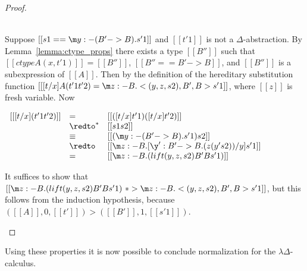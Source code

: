 \begin{proof}
\begin{itemize}
    \ \\
    Suppose $[[s1 == \m y:{-(B'->B)}.s'1]]$ and $[[t'1]]$ is not a $\Delta$-abstraction.
    By Lemma~\ref{lemma:ctype_props} there exists a type $[[B'']]$ such that
    $[[ctype A (x,t'1)]] = [[B'']]$, $[[B'' == B' -> B]]$, and $[[B'']]$ is a subexpression
    of $[[A]]$.  Then by the definition of the hereditary substitution function
    $[[ [t/x] A (t'1 t'2) = \m z:{-B}.<(y,z,s2),B',B>s'1]]$, where $[[z]]$ is fresh variable.
    Now
    \begin{center}
      \begin{math}
        \begin{array}{lll}
          [[ [t/x] (t'1 t'2)]] & = & [[([t/x] t'1) ([t/x] t'2)]]\\
          & \redto^* & [[s1 s2]]\\
          & \equiv & [[(\m y:{-(B'->B)}.s'1) s2]]\\
          & \redto & [[\m z:{-B}.[\y':B'->B.(z (y' s2))/y]s'1]]\\
          & = & [[\m z:{-B}.(lift (y,z,s2) B' B s'1)]]
        \end{array}
      \end{math}
    \end{center}
    It suffices to show that $[[\m z:{-B}.(lift (y,z,s2) B' B s'1) ~*> \m z:{-B}.<(y,z,s2),B',B>s'1]]$,
    but this follows from the induction hypothesis, because $([[A]],0,[[t']]) > ([[B']],1,[[s'1]])$.
  \end{itemize} 
\end{proof}
Using these properties it is now possible to conclude normalization for the $\lambda\Delta$-calculus.

